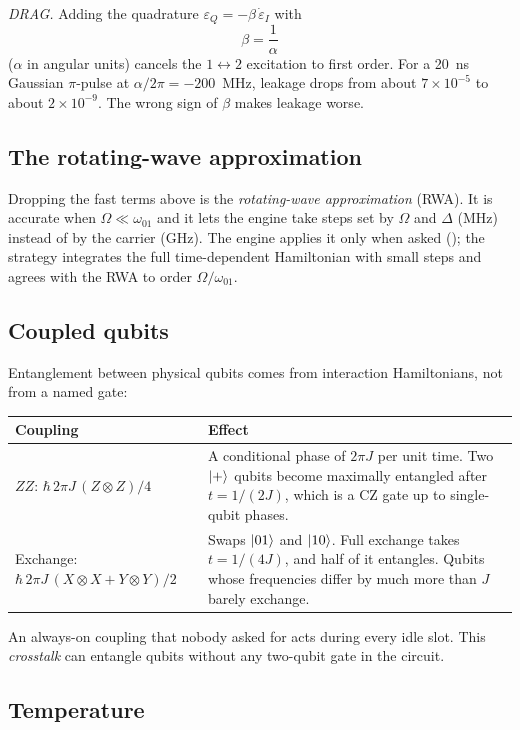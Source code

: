 \emph{DRAG.} Adding the quadrature $\varepsilon_Q=-\beta\,\dot\varepsilon_I$
with
\[
\beta=\frac1\alpha
\]
($\alpha$ in angular units) cancels the $1\leftrightarrow2$ excitation to first
order. For a 20~ns Gaussian $\pi$-pulse at $\alpha/2\pi=-200$~MHz, leakage
drops from about $7\times10^{-5}$ to about $2\times10^{-9}$. The wrong sign of
$\beta$ makes leakage worse.

\subsection{The rotating-wave approximation}

Dropping the fast terms above is the \emph{rotating-wave approximation}
(RWA). It is accurate when $\Omega\ll\omega_{01}$ and it lets the engine take
steps set by $\Omega$ and $\Delta$ (MHz) instead of by the carrier (GHz).
The engine applies it only when asked (); the
 strategy integrates the full time-dependent Hamiltonian with
small steps and agrees with the RWA to order $\Omega/\omega_{01}$.

\subsection{Coupled qubits}

Entanglement between physical qubits comes from interaction Hamiltonians,
not from a named gate:
\begin{center}
\begin{tabularx}{\textwidth}{l X}
\toprule
Coupling & Effect\\
\midrule
$ZZ$: $\hbar\,2\pi J\,(Z\otimes Z)/4$ & A conditional phase of $2\pi J$ per
unit time. Two $\lvert +\rangle$ qubits become maximally entangled after
$t=1/(2J)$, which is a CZ gate up to single-qubit phases.\\
Exchange: $\hbar\,2\pi J\,(X\otimes X+Y\otimes Y)/2$ & Swaps $\lvert 01\rangle$ and
$\lvert 10\rangle$. Full exchange takes $t=1/(4J)$, and half of it entangles. Qubits
whose frequencies differ by much more than $J$ barely exchange.\\
\bottomrule
\end{tabularx}
\end{center}
An always-on coupling that nobody asked for acts during every idle slot.
This \emph{crosstalk} can entangle qubits without any two-qubit gate in the
circuit.

\subsection{Temperature}

